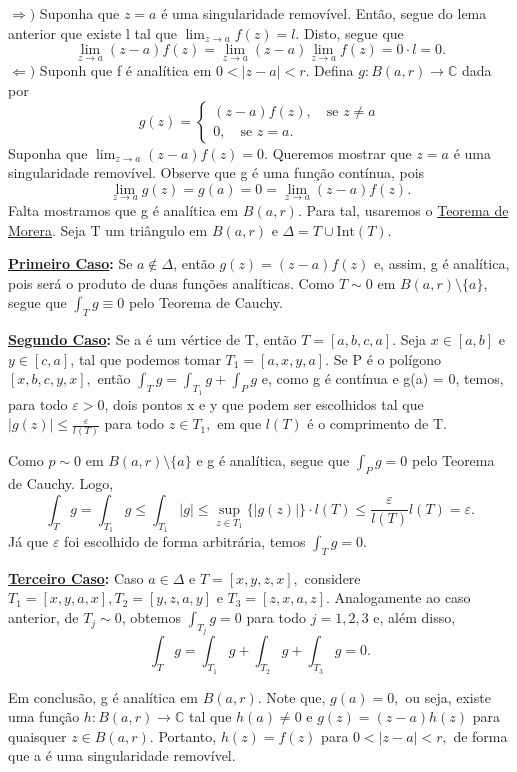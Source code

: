 \documentclass[complex.tex]{subfiles}
\begin{document}
\begin{proof*}
	\(\Rightarrow )\) Suponha que \(z=a\) é uma singularidade removível. Então, segue do lema anterior que existe l tal que \(\lim_{z\to a}f(z) = l.\) Disto, segue que
	\[
		\lim_{z\to a}(z-a)f(z) = \lim_{z\to a}(z-a)\lim_{z\to a}f(z) = 0 \cdot l = 0.
	\]
	\(\Leftarrow )\) Suponh que f é analítica em \(0 < |z-a| < r.\) Defina \(g:B(a, r)\rightarrow \mathbb{C}\) dada por
	\[
		g(z) = \left\{\begin{array}{ll}
			(z-a)f(z),\quad \text{se }z\neq a \\
			0,\quad \text{se }z=a.
		\end{array}\right.
	\]
	Suponha que \(\lim_{z\to a}(z-a)f(z) = 0\). Queremos mostrar que \(z = a\) é uma singularidade removível.
	Observe que g é uma função contínua, pois
	\[
		\lim_{z\to a}g(z) = g(a) = 0 = \lim_{z\to a}(z-a)f(z).
	\]
	Falta mostramos que g é analítica em \(B(a, r)\). Para tal, usaremos o \hyperlink{morera}{Teorema de Morera}.
	Seja T um triângulo em \(B(a, r)\) e \(\Delta = T\cup \mathrm{Int}(T)\).

	\textbf{\underline{Primeiro Caso}:} Se \(a\not\in \Delta \), então \(g(z) = (z-a)f(z)\) e, assim, g é analítica, pois
	será o produto de duas funções analíticas. Como \(T\sim 0\) em \(B(a, r)\setminus{\{a\}}\), segue que \(\int_{T}^{}g\equiv 0\) pelo
	Teorema de Cauchy.

	\textbf{\underline{Segundo Caso}:} Se a é um vértice de T, então \(T = [a, b, c, a].\) Seja \(x\in [a, b]\) e \(y\in [c, a]\), tal que
	podemos tomar \(T_{1} = [a, x, y, a].\) Se P é o polígono \([x, b, c, y, x],\) então \(\int_{T}^{}g = \int_{T_{1}}^{}g + \int_{P}^{}g\) e, como g
	é contínua e g(a) = 0, temos, para todo \(\varepsilon > 0\), dois pontos x e y que podem ser escolhidos tal que \(|g(z)| \leq \frac{\varepsilon }{l(T)}\)
	para todo \(z\in T_{1},\) em que \(l(T)\) é o comprimento de T.

	Como \(p\sim 0\) em \(B(a, r)\setminus{\{a\}}\) e g é analítica, segue que \(\int_{P}^{}g = 0\) pelo Teorema de Cauchy. Logo,
	\[
		\int_{T}^{}g = \int_{T_{1}}^{} g \leq \int_{T_{1}}^{}|g| \leq \sup_{z\in T_{1}}\{|g(z)|\}\cdot l(T) \leq \frac{\varepsilon }{l(T)}l(T) = \varepsilon .
	\]
	Já que \(\varepsilon \) foi escolhido de forma arbitrária, temos \(\int_{T}^{}g = 0.\)

	\textbf{\underline{Terceiro Caso}:} Caso \(a\in \Delta \) e \(T = [x, y, z, x],\) considere \(T_{1} = [x, y, a, x], T_{2} = [y, z, a, y]\) e \(T_{3} = [z, x, a, z].\)
	Analogamente ao caso anterior, de \(T_{j}\sim 0\), obtemos \(\int_{T_{j}}^{}g = 0\) para todo \(j = 1, 2, 3\) e, além disso,
	\[
		\int_{T}^{}g = \int_{T_{1}}^{}g + \int_{T_{2}}^{} g + \int_{T_{3}}^{}g = 0.
	\]

	Em conclusão, g é analítica em \(B(a, r).\) Note que, \(g(a) = 0,\) ou seja, existe uma função \(h:B(a, r)\rightarrow \mathbb{C}\) tal que \(h(a)\neq0\) e \(g(z) = (z-a)h(z)\)
	para quaisquer \(z\in B(a, r).\) Portanto, \(h(z) = f(z)\) para \(0 < |z-a| < r,\) de forma que a é uma singularidade removível. \qedsymbol
\end{proof*}
\end{document}
